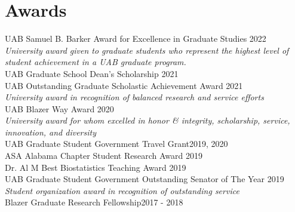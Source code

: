 \section{Awards} 
UAB Samuel B. Barker Award for Excellence in Graduate Studies \hfill 2022\\
\textit{University award given to graduate students who represent the highest level of student achievement in a UAB graduate program. }\\

UAB Graduate School Dean's Scholarship \hfill 2021\\

UAB Outstanding Graduate Scholastic Achievement Award \hfill 2021\\
\textit{University award in recognition of balanced research and service efforts}\\

UAB Blazer Way Award \hfill 2020\\
\textit{University award for whom excelled in honor \& integrity, scholarship, service, innovation, and diversity}\\

UAB Graduate Student Government Travel Grant\hfill 2019, 2020\\

ASA Alabama Chapter Student Research Award \hfill 2019\\

Dr. Al M Best Biostatistics Teaching Award \hfill 2019\\

UAB Graduate Student Government Outstanding Senator of The Year \hfill 2019\\
\textit{Student organization award in recognition of outstanding service}\\

Blazer Graduate Research Fellowship\hfill 2017 - 2018
